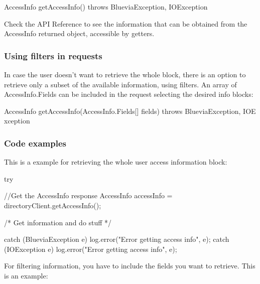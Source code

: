 \begin{DoxyCode}
AccessInfo getAccessInfo() throws BlueviaException, IOException
\end{DoxyCode}


Check the API Reference to see the information that can be obtained from the AccessInfo returned object, accessible by getters.\hypertarget{blv_directory_guide_user_access_info_using_filters_sec}{}\subsubsection{Using filters in requests}\label{blv_directory_guide_user_access_info_using_filters_sec}
In case the user doesn't want to retrieve the whole block, there is an option to retrieve only a subset of the available information, using filters. An array of AccessInfo.Fields can be included in the request selecting the desired info blocks:


\begin{DoxyCode}
AccessInfo getAccessInfo(AccessInfo.Fields[] fields) throws BlueviaException, IOE
      xception
\end{DoxyCode}
\hypertarget{blv_directory_guide_user_access_info_code_example_sec}{}\subsubsection{Code examples}\label{blv_directory_guide_user_access_info_code_example_sec}
This is a example for retrieving the whole user access information block:


\begin{DoxyCode}
try {
        //Get the AccessInfo response
        AccessInfo accessInfo = directoryClient.getAccessInfo();

        /* Get information and do stuff */
          
} catch (BlueviaException e) {
        log.error("Error getting access info", e);
} catch (IOException e) {
        log.error("Error getting access info", e);
}
\end{DoxyCode}


For filtering information, you have to include the fields you want to retrieve. This is an example:



